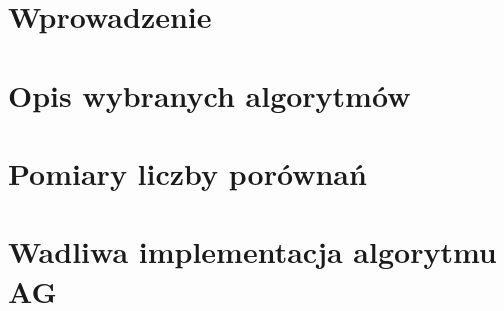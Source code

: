 \documentclass[11pt]{report}
\theoremstyle{definition}
\begin{document}



\tableofcontents

\chapter{Wprowadzenie}


\chapter[Opis wybranych algorytmów]{Opis wybranych algorytmów}


\chapter[Pomiary liczby porównań]{Pomiary liczby porównań}


\appendix
\chapter{Wadliwa implementacja algorytmu AG}


\singlespacing
\printbibliography
\end{document}
